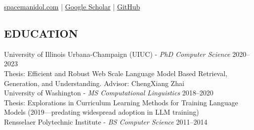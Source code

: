 \documentclass[line,margin]{res}
\begin{document}
\address{\href{mailto:daniel.campos@zipf.ai}{daniel.campos@zipf.ai}}
\href{https://spacemanidol.com/}{spacemanidol.com} | \href{https://scholar.google.com/citations?user=nlHptm8AAAAJ&hl=en}{Google Scholar} | \href{https://github.com/spacemanidol}{GitHub}
\begin{resume}
\section{EDUCATION}
University of Illinois Urbana-Champaign (UIUC) - {\sl PhD Computer Science} 2020--2023 \\
{\small Thesis: Efficient and Robust Web Scale Language Model Based Retrieval, Generation, and Understanding. Advisor: ChengXiang Zhai} \\
University of Washington - {\sl MS Computational Linguistics} 2018--2020 \\
{\small Thesis: Explorations in Curriculum Learning Methods for Training Language Models (2019---predating widespread adoption in LLM training)} \\
Rensselaer Polytechnic Institute - {\sl BS Computer Science} 2011--2014


\end{resume}
\end{document}
